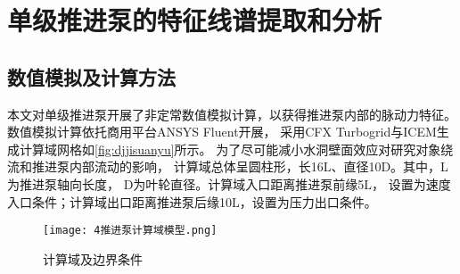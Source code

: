 \begin{comment}
    
推进泵噪声是推进泵流致激励特性的最直接的外在表现，
推进泵声信号中包含着丰富的运行状态和流致激励源特性，
前面章节的研究表明推进泵噪声的频谱呈现出宽带与线谱交叠的形貌，中低频线谱成分复杂，
噪声信噪比较低，特征信号如流致激励源特征频率、轴频等与其他背景噪声相比均较为微弱，
给基于传统噪声特征提取方法带来了困难，难以准确的获得推进泵的工作状态和结构信息。
上章节通过对噪声的成分分析，基于推进泵噪声的循环平稳特征，推导出流致激励源-声信号的调幅调制模型。
进一步为了验证从声信号中提取流致激励源特征的合理性和可行性，
本章节通过非定常数值模拟计算获取了多工况下推进泵的激励力信号，
分析了推进泵流致振动噪声源的关键特性，
采用循环平稳分析方法实现推进泵低频特征的提取，
联合从声信号中提取特征频率的结果与流致激励源的模拟结果，
从声信号中分析出流致激励源对噪声的影响程度以及两者的作用机理，
探究推进泵噪声的调制特性。
\end{comment}
\section{单级推进泵的特征线谱提取和分析}
\subsection{数值模拟及计算方法}
本文对单级推进泵开展了非定常数值模拟计算，以获得推进泵内部的脉动力特征。
数值模拟计算依托商用平台ANSYS Fluent开展，
采用CFX Turbogrid与ICEM生成计算域网格如\autoref{fig:djjisuanyu}所示。
为了尽可能减小水洞壁面效应对研究对象绕流和推进泵内部流动的影响，
计算域总体呈圆柱形，长16L、直径10D\cite{jiang2017}。其中，L为推进泵轴向长度，
D为叶轮直径。计算域入口距离推进泵前缘5L，
设置为速度入口条件；计算域出口距离推进泵后缘10L，设置为压力出口条件。
\begin{figure}[htbp]
    \centering
    \texttt{[image: 4推进泵计算域模型.png]}
    \caption{\label{fig:djjisuanyu}计算域及边界条件}
\end{figure}

